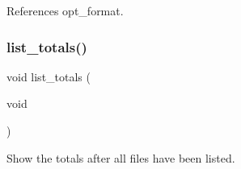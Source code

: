 References opt\+\_\+format.

\mbox{\label{list_8h_a569ef6a3578fb357c9c3246c2fe14607}} 
\subsubsection{list\+\_\+totals()}
{\footnotesize\ttfamily void list\+\_\+totals (\begin{DoxyParamCaption}\item[{void}]{ }\end{DoxyParamCaption})}



Show the totals after all files have been listed. 

